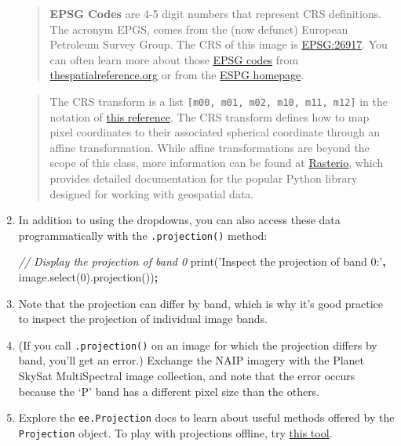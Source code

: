 \documentclass[
]{article}
\newenvironment{Shaded}{\begin{snugshade}}{\end{snugshade}}
\newcommand{\AttributeTok}[1]{\textcolor[rgb]{0.77,0.63,0.00}{#1}}
\newcommand{\CommentTok}[1]{\textcolor[rgb]{0.56,0.35,0.01}{\textit{#1}}}
\newcommand{\DecValTok}[1]{\textcolor[rgb]{0.00,0.00,0.81}{#1}}
\newcommand{\NormalTok}[1]{#1}
\newcommand{\OperatorTok}[1]{\textcolor[rgb]{0.81,0.36,0.00}{\textbf{#1}}}
\newcommand{\StringTok}[1]{\textcolor[rgb]{0.31,0.60,0.02}{#1}}
\newcommand{\VariableTok}[1]{\textcolor[rgb]{0.00,0.00,0.00}{#1}}
\begin{document}
\begin{enumerate}
  \begin{quote}
  \textbf{EPSG Codes} are 4-5 digit numbers that represent CRS definitions. The acronym EPGS, comes from the (now defunct) European Petroleum Survey Group. The CRS of this image is \href{https://spatialreference.org/ref/epsg/nad83-utm-zone-17n/}{EPSG:26917}. You can often learn more about those \href{http://www.epsg-registry.org/}{EPSG codes} from \href{http://spatialreference.org/}{thespatialreference.org} or from the \href{https://epsg.org/home.html}{ESPG homepage}.
  \end{quote}

  \begin{quote}
  The CRS transform is a list \texttt{{[}m00,\ m01,\ m02,\ m10,\ m11,\ m12{]}} in the notation of \href{http://docs.oracle.com/javase/7/docs/api/java/awt/geom/AffineTransform.html}{this reference}. The CRS transform defines how to map pixel coordinates to their associated spherical coordinate through an affine transformation. While affine transformations are beyond the scope of this class, more information can be found at \href{https://rasterio.readthedocs.io/en/latest/topics/georeferencing.html}{Rasterio}, which provides detailed documentation for the popular Python library designed for working with geospatial data.
  \end{quote}
\item
  In addition to using the dropdowns, you can also access these data programmatically with the \texttt{.projection()} method:

\begin{Shaded}
\begin{Highlighting}[]
\CommentTok{// Display the projection of band 0}
\AttributeTok{print}\NormalTok{(}\StringTok{'Inspect the projection of band 0:'}\OperatorTok{,} \VariableTok{image}\NormalTok{.}\AttributeTok{select}\NormalTok{(}\DecValTok{0}\NormalTok{).}\AttributeTok{projection}\NormalTok{())}\OperatorTok{;}
\end{Highlighting}
\end{Shaded}
\item
  Note that the projection can differ by band, which is why it's good practice to inspect the projection of individual image bands.
\item
  (If you call \texttt{.projection()} on an image for which the projection differs by band, you'll get an error.) Exchange the NAIP imagery with the Planet SkySat MultiSpectral image collection, and note that the error occurs because the `P' band has a different pixel size than the others.
\item
  Explore the \texttt{ee.Projection} docs to learn about useful methods offered by the \texttt{Projection} object. To play with projections offline, try \href{http://www.giss.nasa.gov/tools/gprojector/}{this tool}.
\end{enumerate}
\end{document}
